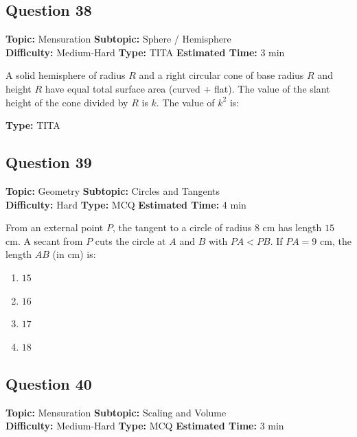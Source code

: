 \documentclass[11pt]{article}
\begin{document}
\subsection*{Question 38}
\textbf{Topic:} Mensuration \quad \textbf{Subtopic:} Sphere / Hemisphere \\
\textbf{Difficulty:} Medium-Hard \quad \textbf{Type:} TITA \quad \textbf{Estimated Time:} 3 min

\begin{tcolorbox}
A solid hemisphere of radius \(R\) and a right circular cone of base radius \(R\) and height \(R\) have equal total surface area (curved + flat). The value of the slant height of the cone divided by \(R\) is \(k\). The value of \(k^2\) is:
\end{tcolorbox}

\textbf{Type:} TITA

\subsection*{Question 39}
\textbf{Topic:} Geometry \quad \textbf{Subtopic:} Circles and Tangents \\
\textbf{Difficulty:} Hard \quad \textbf{Type:} MCQ \quad \textbf{Estimated Time:} 4 min

\begin{tcolorbox}
From an external point \(P\), the tangent to a circle of radius \(8\) cm has length \(15\) cm. A secant from \(P\) cuts the circle at \(A\) and \(B\) with \(PA < PB\). If \(PA = 9\) cm, the length \(AB\) (in cm) is:
\end{tcolorbox}

\begin{enumerate}[label=(\Alph*)]
    \item \(15\)
    \item \(16\)
    \item \(17\)
    \item \(18\)
\end{enumerate}

\subsection*{Question 40}
\textbf{Topic:} Mensuration \quad \textbf{Subtopic:} Scaling and Volume \\
\textbf{Difficulty:} Medium-Hard \quad \textbf{Type:} MCQ \quad \textbf{Estimated Time:} 3 min
\end{document}
